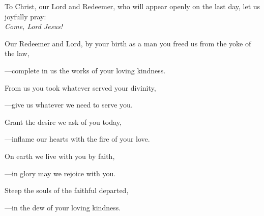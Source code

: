 \intercessions\indent

\begin{hangpar}

To Christ, our Lord and Redeemer, who will appear openly on the last day, let us joyfully pray:\\
\emph{Come, Lord Jesus!}

\medskip Our Redeemer and Lord, by your birth as a man you freed us from the yoke of the law,

{\color{red}---\thinspace}complete in us the works of your loving kindness.

\medskip From us you took whatever served your divinity,

{\color{red}---\thinspace}give us whatever we need to serve you.

\medskip Grant the desire we ask of you today,

{\color{red}---\thinspace}inflame our hearts with the fire of your love.

\medskip On earth we live with you by faith,

{\color{red}---\thinspace}in glory may we rejoice with you.

\medskip Steep the souls of the faithful departed,

{\color{red}---\thinspace}in the dew of your loving kindness.

\end{hangpar}